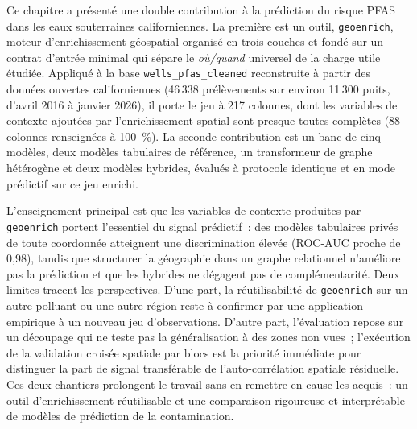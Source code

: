 \label{sec:synthese-chap3}

Ce chapitre a pr\'esent\'e une double contribution \`a la pr\'ediction du risque PFAS dans les eaux souterraines californiennes. La premi\`ere est un outil, \texttt{geoenrich}, moteur d'enrichissement g\'eospatial organis\'e en trois couches et fond\'e sur un contrat d'entr\'ee minimal qui s\'epare le \emph{o\`u/quand} universel de la charge utile \'etudi\'ee. Appliqu\'e \`a la base \texttt{wells\_pfas\_cleaned} reconstruite \`a partir des donn\'ees ouvertes californiennes (46\,338 pr\'el\`evements sur environ 11\,300 puits, d'avril 2016 \`a janvier 2026), il porte le jeu \`a 217 colonnes, dont les variables de contexte ajout\'ees par l'enrichissement spatial sont presque toutes compl\`etes (88 colonnes renseign\'ees \`a 100~\%). La seconde contribution est un banc de cinq mod\`eles, deux mod\`eles tabulaires de r\'ef\'erence, un transformeur de graphe h\'et\'erog\`ene et deux mod\`eles hybrides, \'evalu\'es \`a protocole identique et en mode pr\'edictif sur ce jeu enrichi.

L'enseignement principal est que les variables de contexte produites par \texttt{geoenrich} portent l'essentiel du signal pr\'edictif~: des mod\`eles tabulaires priv\'es de toute coordonn\'ee atteignent une discrimination \'elev\'ee (ROC-AUC proche de 0,98), tandis que structurer la g\'eographie dans un graphe relationnel n'am\'eliore pas la pr\'ediction et que les hybrides ne d\'egagent pas de compl\'ementarit\'e. Deux limites tracent les perspectives. D'une part, la r\'eutilisabilit\'e de \texttt{geoenrich} sur un autre polluant ou une autre r\'egion reste \`a confirmer par une application empirique \`a un nouveau jeu d'observations. D'autre part, l'\'evaluation repose sur un d\'ecoupage qui ne teste pas la g\'en\'eralisation \`a des zones non vues~; l'ex\'ecution de la validation crois\'ee spatiale par blocs est la priorit\'e imm\'ediate pour distinguer la part de signal transf\'erable de l'auto-corr\'elation spatiale r\'esiduelle. Ces deux chantiers prolongent le travail sans en remettre en cause les acquis~: un outil d'enrichissement r\'eutilisable et une comparaison rigoureuse et interpr\'etable de mod\`eles de pr\'ediction de la contamination.
